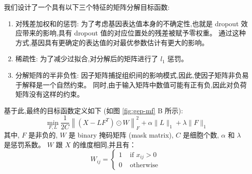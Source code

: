 我们设计了一个具有以下三个特征的矩阵分解目标函数:
\begin{enumerate}[label=(\arabic*),itemindent=2em]
    \item 对残差加权和的惩罚: 为了考虑基因表达值本身的不确定性,也就是 dropout 效应带来的影响,具有 dropout 值的对应位置处的残差被赋予零权重。
          通过这种方式,基因具有更确定的表达值的对最优参数估计有更大的影响。
    \item 稀疏性: 为了减少过拟合,对分解后的矩阵进行了 $l_1$ 惩罚。
    \item 分解矩阵的半非负性: 因子矩阵捕捉组织间的影响模式,因此,使因子矩阵非负易于解释是一个自然约束。
          同时,由于输入矩阵中数值可能有正有负,因此对负荷矩阵没有这样的约束。
\end{enumerate}
基于此,最终的目标函数定义如下 (如图 \ref{fig:gep-mf} B 所示):
\begin{equation}
    \label{eq:obj}
    \min _{F, L} \frac{1}{2 C}\left\|\left(X-L F^{T}\right) \odot W\right\|_{F}^{2}+\alpha\|L\|_{1}+\lambda\|F\|_{1}
\end{equation}
其中, $F$ 是非负的, $W$ 是 binary 掩码矩阵 (mask matrix), $C$ 是细胞个数,
 $\alpha$ 和 $\lambda$ 是惩罚系数。
$W$ 跟 $X$ 的维度相同,并且有：
\begin{equation}
    W_{i j}=\left\{\begin{array}{ll}1 & \text { if } x_{i j}>0 \\ 0 & \text { otherwise }\end{array}\right.
\end{equation}

